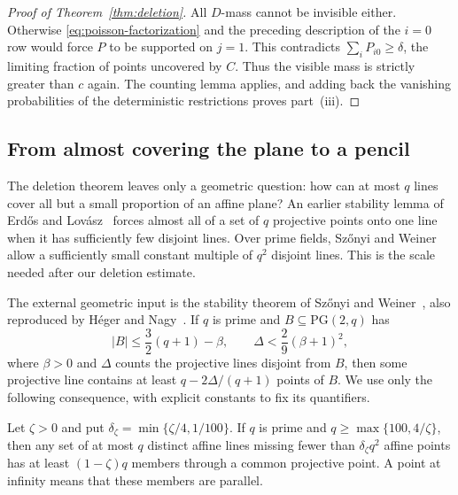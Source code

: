 \begin{proof}[Proof of Theorem~\ref{thm:deletion}]
All $D$-mass cannot be invisible either.  Otherwise
\eqref{eq:poisson-factorization} and the preceding description of the
$i=0$ row would force $P$ to be supported on $j=1$.  This contradicts
$\sum_iP_{i0}\ge\delta$, the limiting fraction of points uncovered by
$C$.  Thus the visible mass is strictly greater than $c$ again.  The
counting lemma applies, and adding back the vanishing probabilities of
the deterministic restrictions proves part~\textup{(iii)}.
\end{proof}

\subsection{From almost covering the plane to a pencil}

The deletion theorem leaves only a geometric question: how can at most
$q$ lines cover all but a small proportion of an affine plane?
An earlier stability lemma of Erd\H{o}s and
Lov\'asz~\cite[Section~4, proof of Theorem~10, part~II]{ErdosLovasz1975}
forces almost all of a set of $q$ projective points onto one line when
it has sufficiently few disjoint lines.  Over prime fields, Sz\H{o}nyi
and Weiner allow a sufficiently small constant multiple of $q^2$
disjoint lines.  This is the scale needed after
our deletion estimate.

The external geometric input is the stability theorem of Sz\H{o}nyi and
Weiner~\cite[Theorem~4]{SzonyiWeiner2012}, also reproduced by H\'eger and
Nagy~\cite[Result~3.6]{HegerNagy2017}.  If $q$ is prime and
$B\subseteq\mathrm{PG}(2,q)$ has
\[
 |B|\le\frac32(q+1)-\beta,
 \qquad
 \Delta<\frac29(\beta+1)^2,
\]
where $\beta>0$ and $\Delta$ counts the projective lines disjoint from
$B$, then some projective line contains at least
$q-2\Delta/(q+1)$ points of $B$.  We use only the following consequence,
with explicit constants to fix its quantifiers.

\begin{lemma}
\label{lem:prime-stability}
Let $\zeta>0$ and put $\delta_\zeta=\min\{\zeta/4,1/100\}$.
If $q$ is prime and $q\ge\max\{100,4/\zeta\}$, then any set of at most
$q$ distinct affine lines missing fewer than $\delta_\zeta q^2$ affine
points has at least $(1-\zeta)q$ members through a common projective
point.  A point at infinity means that these members are parallel.
\end{lemma}

